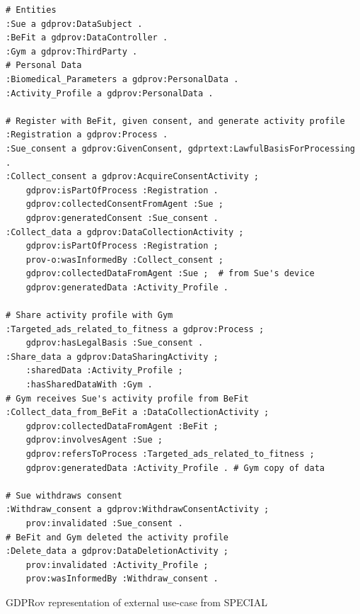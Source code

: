 \begin{listing}[htbp]
\begin{verbatim}
# Entities
:Sue a gdprov:DataSubject .
:BeFit a gdprov:DataController .
:Gym a gdprov:ThirdParty .
# Personal Data
:Biomedical_Parameters a gdprov:PersonalData .
:Activity_Profile a gdprov:PersonalData .

# Register with BeFit, given consent, and generate activity profile
:Registration a gdprov:Process .
:Sue_consent a gdprov:GivenConsent, gdprtext:LawfulBasisForProcessing .
:Collect_consent a gdprov:AcquireConsentActivity ;
    gdprov:isPartOfProcess :Registration .
    gdprov:collectedConsentFromAgent :Sue ;
    gdprov:generatedConsent :Sue_consent .
:Collect_data a gdprov:DataCollectionActivity ;
    gdprov:isPartOfProcess :Registration ;
    prov-o:wasInformedBy :Collect_consent ;
    gdprov:collectedDataFromAgent :Sue ;  # from Sue's device
    gdprov:generatedData :Activity_Profile .

# Share activity profile with Gym
:Targeted_ads_related_to_fitness a gdprov:Process ;
    gdprov:hasLegalBasis :Sue_consent .
:Share_data a gdprov:DataSharingActivity ;
    :sharedData :Activity_Profile ;
    :hasSharedDataWith :Gym .
# Gym receives Sue's activity profile from BeFit
:Collect_data_from_BeFit a :DataCollectionActivity ;
    gdprov:collectedDataFromAgent :BeFit ;
    gdprov:involvesAgent :Sue ;
    gdprov:refersToProcess :Targeted_ads_related_to_fitness ;
    gdprov:generatedData :Activity_Profile . # Gym copy of data

# Sue withdraws consent
:Withdraw_consent a gdprov:WithdrawConsentActivity ;
    prov:invalidated :Sue_consent .
# BeFit and Gym deleted the activity profile
:Delete_data a gdprov:DataDeletionActivity ;
    prov:invalidated :Activity_Profile ;
    prov:wasInformedBy :Withdraw_consent .
\end{verbatim}
\caption{GDPRov representation of external use-case from SPECIAL}
\label{code:gdprov:use-case:special}
\end{listing}
